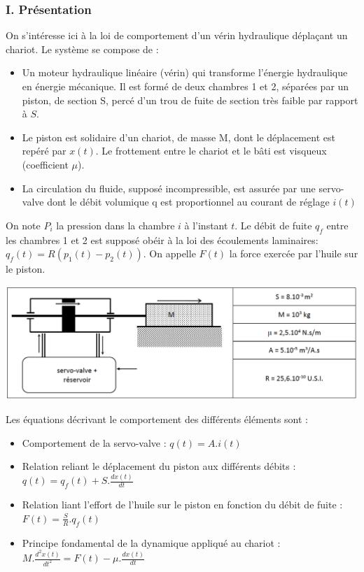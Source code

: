 \subsubsection{I. Pr\'esentation}
On s'int\'eresse ici \`a la loi de comportement d'un v\'erin hydraulique d\'epla\c{c}ant un chariot.
Le syst\`eme se compose de :

\begin{itemize}
\item Un moteur hydraulique lin\'eaire (v\'erin) qui transforme l'\'energie hydraulique en \'energie m\'ecanique. Il est
form\'e de deux chambres 1 et 2, s\'epar\'ees par un piston, de section S, perc\'e d'un trou de fuite de section
tr\`es faible par rapport \`a $S$.
\item Le piston est solidaire d'un chariot, de masse M, dont le d\'eplacement est rep\'er\'e par $x(t)$. Le frottement entre
le chariot et le b\^ati est visqueux (coefficient $\mu$).
\item La circulation du fluide, suppos\'e incompressible, est assur\'ee par une servo-valve dont le d\'ebit volumique
q est proportionnel au courant de r\'eglage $i(t)$ 
\end{itemize}
On note $P_i$ la pression dans la chambre $i$ \`a l'instant $t$. Le d\'ebit de fuite $q_f$ entre les chambres 1 et 2 est
suppos\'e ob\'eir \`a la loi des \'ecoulements laminaires: $q_f(t) = R (p_1(t) - p_2(t))$. On appelle $F(t)$ la force exerc\'ee par l'huile sur
le piston.\\
\hspace*{0mm}
\begin{center}
\includegraphics[scale=0.4]{png/img1_prob1.png}
\end{center}
\hspace*{0mm}
Les \'equations d\'ecrivant le comportement des diff\'erents \'el\'ements sont :
\begin{itemize}
\item Comportement de la servo-valve : $ q(t)=A.i(t)$
\item Relation reliant le d\'eplacement du piston aux diff\'erents d\'ebits : $q(t)=q_f(t)+S.\frac{dx(t)}{dt}$
\item Relation liant l'effort de l'huile sur le piston en fonction du d\'ebit de fuite : $F(t)=\frac{S}{R}.q_f(t)$
\item Principe fondamental de la dynamique appliqu\'e au chariot : $M.\frac{d^2x(t)}{dt^2} = F(t)-\mu.\frac{dx(t)}{dt}$
\end{itemize}
\newpage


